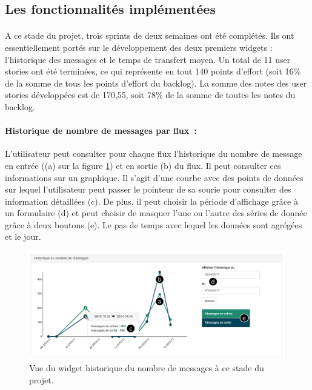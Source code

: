 		\subsection{Les fonctionnalités implémentées}
			\paragraph{}%
			A ce stade du projet, trois sprints de deux semaines ont été complétés. Ils
			ont essentiellement portés sur le développement des deux premiers widgets :
			l'historique des messages et le temps de transfert moyen. Un total de 11 user
			stories ont été terminées, ce qui représente en tout 140 points d'effort
			(soit 16\% de la somme de tous les points d'effort du backlog). La somme des
			notes des user stories développées est de 170,55, soit 78\% de la somme de toutes
			les notes du backlog.
		
			\paragraph{Historique de nombre de messages par flux~: }
			L'utilisateur peut consulter pour chaque flux l'historique du nombre de
			message en entrée ((a) sur la figure \ref{vue_history}) et en sortie (b) du
			flux. Il peut consulter ces informations sur un graphique. Il s'agit d'une courbe avec des points de données sur
			lequel l'utilisateur peut passer le pointeur de sa sourie pour consulter des
			information détaillées (c). De plus, il peut choisir la période d'affichage
			grâce à un formulaire (d) et peut choisir de masquer l'une ou l'autre des
			séries de donnée grâce à deux boutons (e). Le pas de temps avec lequel les
			données sont agrégées et le jour.
			\begin{figure}[H]
				\centering
				\includegraphics[width=12cm]{../img/part3/vue_history.png}
				\caption{\label{vue_history} Vue du widget historique du nombre de messages
				à ce stade du projet.}
			\end{figure}
			
